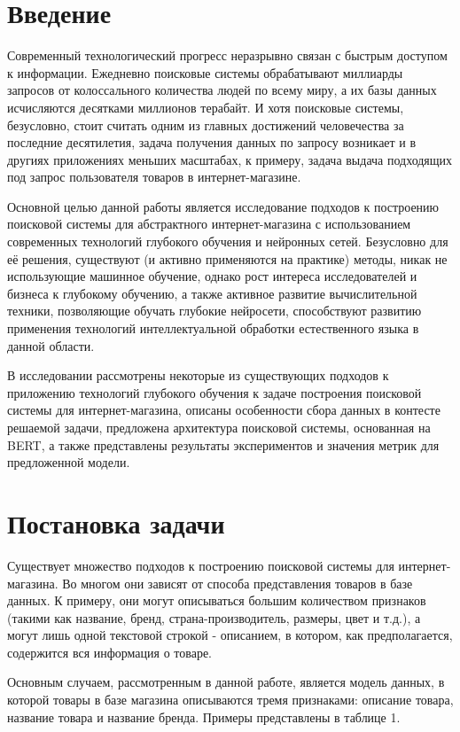 \documentclass[12pt,a4paper]{article}
\begin{document}
\newpage
\section{Введение}

Современный технологический прогресс неразрывно связан с быстрым доступом к информации. Ежедневно поисковые системы обрабатывают миллиарды запросов от колоссального количества людей по всему миру, а их базы данных исчисляются десятками миллионов терабайт. И хотя поисковые системы, безусловно, стоит считать одним из главных достижений человечества за последние десятилетия, задача получения данных по запросу возникает и в другиях приложениях меньших масштабах, к примеру, задача выдача подходящих под запрос пользователя товаров в интернет-магазине. 

Основной целью данной работы является исследование подходов к построению поисковой системы для абстрактного интернет-магазина с использованием современных технологий глубокого обучения и нейронных сетей. Безусловно для её решения, существуют (и активно применяются на практике) методы, никак не использующие машинное обучение, однако рост интереса исследователей и бизнеса к глубокому обучению, а также активное развитие вычислительной техники, позволяющие обучать глубокие нейросети, способствуют развитию применения технологий интеллектуальной обработки естественного языка в данной области.

В исследовании рассмотрены некоторые из существующих подходов к приложению технологий глубокого обучения к задаче построения поисковой системы для интернет-магазина, описаны особенности сбора данных в контесте решаемой задачи, предложена архитектура поисковой системы, основанная на BERT, а также представлены результаты экспериментов и значения метрик для предложенной модели. 

\section{Постановка задачи}

Существует множество подходов к построению поисковой системы для интернет-магазина. Во многом они зависят от способа представления товаров в базе данных. К примеру, они могут описываться большим количеством признаков (такими как название, бренд, страна-производитель, размеры, цвет и т.д.), а могут лишь одной текстовой строкой - описанием, в котором, как предполагается, содержится вся информация о товаре.

Основным случаем, рассмотренным в данной работе, является модель данных, в которой товары в базе магазина описываются тремя признаками: описание товара, название товара и название бренда. Примеры представлены в таблице 1.
\end{document}
